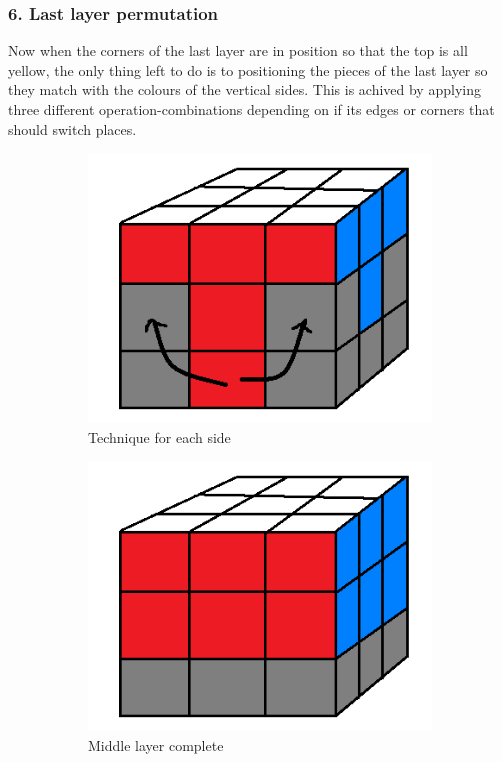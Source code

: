 \documentclass[a4paper,11pt]{kth-mag}
\begin{document}
\subsubsection{6. Last layer permutation}
Now when the corners of the last layer are in position so that the top is all yellow, the only thing left to do is to positioning the pieces of the last layer so they match with the colours of the vertical sides. This is achived by applying three different operation-combinations depending on if its edges or corners that should switch places. 
\begin{figure}[h]
	\centering
	\begin{subfigure}[!b]{0.3\textwidth}
		\includegraphics[width=\textwidth]{figs/step32.png}
		\caption{Technique for each side}
		\label{fig_6}
	\end{subfigure}
	\begin{subfigure}[!b]{0.3\textwidth}
		\includegraphics[width=\textwidth]{figs/step31.png}
		\caption{Middle layer complete}
		\label{fig_7}
	\end{subfigure}\caption{}
\end{figure}
\end{document}
